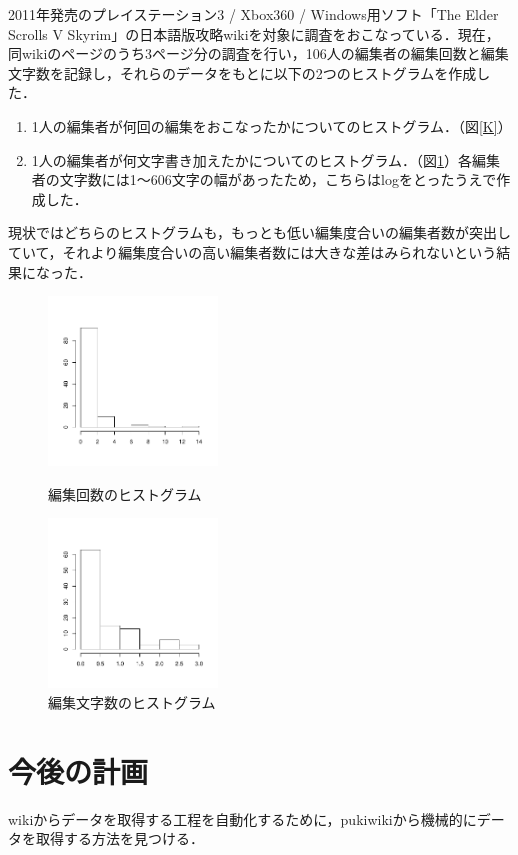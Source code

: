 \documentclass[uplatex,twocolumn,dvipdfmx]{jsarticle}
\begin{document}
2011年発売のプレイステーション3 / Xbox360 / Windows用ソフト「The Elder Scrolls V Skyrim」\cite{wikipedia}の日本語版攻略wiki\cite{wiki}を対象に調査をおこなっている．現在，同wikiのページのうち3ページ分の調査を行い，106人の編集者の編集回数と編集文字数を記録し，それらのデータをもとに以下の2つのヒストグラムを作成した．


\begin{enumerate}
\item 1人の編集者が何回の編集をおこなったかについてのヒストグラム．（図\ref{K}）
\item 1人の編集者が何文字書き加えたかについてのヒストグラム．（図\ref{G}）各編集者の文字数には1～606文字の幅があったため，こちらはlogをとったうえで作成した．
\end{enumerate}

現状ではどちらのヒストグラムも，もっとも低い編集度合いの編集者数が突出していて，それより編集度合いの高い編集者数には大きな差はみられないという結果になった．

\begin{figure}[thbp]
 \begin{minipage}{0.5\hsize}
  \begin{center}
   \includegraphics[width=45mm]{skyrmK.pdf}
   \caption{編集回数のヒストグラム}
   \label{K}
  \end{center}
 \end{minipage}%
 \begin{minipage}{0.5\hsize}
  \begin{center}
   \includegraphics[width=45mm]{skyrmG.pdf}
   \caption{編集文字数のヒストグラム}
   \label{G}
  \end{center}
 \end{minipage}
\end{figure}


\section{今後の計画}

wikiからデータを取得する工程を自動化するために，pukiwikiから機械的にデータを取得する方法を見つける．


\end{document}
